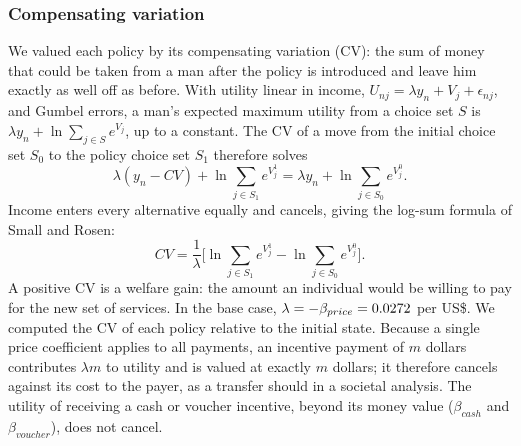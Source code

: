 \documentclass[11pt]{article}
\numberwithin{equation}{section}\numberwithin{figure}{section}\numberwithin{table}{section}
\begin{document}
\subsubsection{Compensating variation}
We valued each policy by its compensating variation (CV): the sum of money that could be taken from a man after the policy is introduced and leave him exactly as well off as before. With utility linear in income, $U_{nj} = \lambda y_n + V_j + \epsilon_{nj}$, and Gumbel errors, a man's expected maximum utility from a choice set $S$ is $\lambda y_n + \ln \sum_{j \in S} e^{V_j}$, up to a constant. The CV of a move from the initial choice set $S_0$ to the policy choice set $S_1$ therefore solves
\begin{equation}\label{eq:cv0}
\lambda (y_n - CV) + \ln \sum_{j \in S_1} e^{V_j^1} = \lambda y_n + \ln \sum_{j \in S_0} e^{V_j^0}.
\end{equation}
Income enters every alternative equally and cancels, giving the log-sum formula of Small and Rosen:\cite{RN93}
\begin{equation}\label{eq:cv}
CV = \frac{1}{\lambda}\Bigg[\ln \sum_{j \in S_1} e^{V_j^1} - \ln \sum_{j \in S_0} e^{V_j^0}\Bigg].
\end{equation}
A positive CV is a welfare gain: the amount an individual would be willing to pay for the new set of services. In the base case, $\lambda = -\beta_{price} = 0.0272$ per US\$. We computed the CV of each policy relative to the initial state. Because a single price coefficient applies to all payments, an incentive payment of $m$ dollars contributes $\lambda m$ to utility and is valued at exactly $m$ dollars; it therefore cancels against its cost to the payer, as a transfer should in a societal analysis. The utility of receiving a cash or voucher incentive, beyond its money value ($\beta_{cash}$ and $\beta_{voucher}$), does not cancel.
\end{document}
